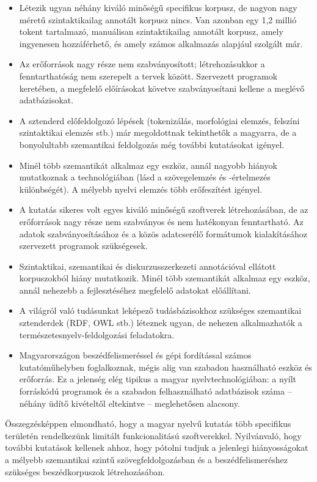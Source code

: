 \begin{multicols}{2}
  \begin{itemize}
  \item Létezik ugyan néhány kiváló mi\-nő\-sé\-gű specifikus korpusz, de nagyon nagy méretű szintaktikailag annotált korpusz nincs. Van  azonban egy 1,2 millió tokent tartalmazó, manuálisan szintaktikailag annotált korpusz, amely ingyenesen hozzáférhető, és amely számos alkalmazás alapjául szolgált már.
  \item Az erőforrások nagy része nem szabványosított; létrehozásukkor a fenn\-tart\-ha\-tó\-ság nem szerepelt a tervek között. Szervezett programok keretében, a megfelelő előírásokat követve szabványosítani kellene a meglévő adatbázisokat. 
  \item A sztenderd előfeldolgozó lépések (tokenizálás, morfológiai elemzés, felszíni szintaktikai elemzés stb.) már megoldottnak tekinthetők a magyarra, de a bonyolultabb szemantikai feldolgozás még további kutatásokat igényel.
  \item Minél több szemantikát alkalmaz egy eszköz, annál nagyobb hiányok mutatkoznak a technológiában (lásd a szövegelemzés és -értelmezés kü\-lönb\-sé\-gét). A mélyebb nyelvi elem\-zés több erőfeszítést igényel.
  \item A kutatás sikeres volt egyes kiváló minőségű szoftverek létrehozásában, de az erőforrások nagy része nem szabványos és nem hatékonyan fenn\-tart\-ha\-tó. Az adatok szab\-vá\-nyo\-sí\-tá\-sá\-hoz és a közös adatcserélő formátumok kialakításához szervezett programok szükségesek.
  \item Szintaktikai, szemantikai és dis\-kur\-zus\-szer\-ke\-ze\-ti annotációval ellátott korpuszokból hiány mutatkozik. Minél több szemantikát alkalmaz egy eszköz, annál nehezebb a fej\-lesz\-té\-sé\-hez megfelelő adatokat előállítani. 
  \item A világról való tudásunkat leképező tudásbázisokhoz szükséges szemantikai sztenderdek (RDF, OWL stb.) léteznek ugyan, de nehezen al\-kal\-maz\-ha\-tók a ter\-mé\-sze\-tes\-nyelv-fel\-dol\-go\-zá\-si feladatokra. 
  \item Magyarországon beszédfelismeréssel és gépi fordítással számos kutatóműhelyben foglalkoznak, mégis alig van szabadon használható esz\-köz és erőforrás. Ez a jelenség elég tipikus a magyar nyelvtechnológiában: a nyílt forráskódú prog\-ra\-mok és a szabadon felhasználható adatbázisok száma -- néhány üdítő kivételtől eltekintve -- meglehetősen alacsony. 
  \end{itemize}

  Összegzésképpen elmondható, hogy a ma\-gyar nyelvű kutatás több specifikus te\-rü\-le\-tén rendelkezünk limitált funkcionalitású szoftverekkel. Nyilvánvaló, hogy további kutatások kellenek ahhoz, hogy pótolni tudjuk a jelenlegi hiányosságokat a mélyebb szemantikai szintű szövegfeldolgozásban és a beszédfelismeréshez szükséges beszédkorpuszok létrehozásában.


\end{multicols}
